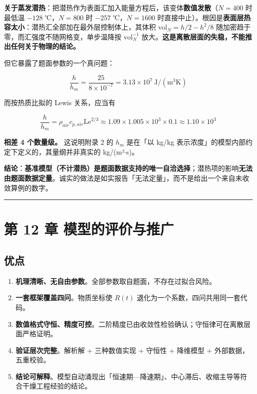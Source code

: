 \textbf{关于蒸发潜热}：把潜热作为表面汇加入能量方程后，该变体\textbf{数值发散}（$N=400$ 时最低温 $-128$ ℃，$N=800$ 时 $-257$ ℃，$N=1600$ 时直接中止）。根因是\textbf{表面层热容太小}：潜热汇全部加在最外层控制体上，其体积 $\mathrm{vol}_N=h/2-h^2/8$ 随加密趋于零，而汇强度不随网格变，单步温降按 $\mathrm{vol}_N^{-1}$ 放大。\textbf{这是离散层面的失稳，不能推出任何关于物理的结论。}


但它暴露了题面参数的一个真问题：


\begin{equation*}
\frac{h}{h_m}=\frac{25}{8\times10^{-7}}=3.13\times10^7\ \mathrm{J/(m^3K)}
\end{equation*}


而按热质比拟的 Lewis 关系，应当有


\begin{equation*}
\frac{h}{h_m}=\rho_{air}c_{p,air}\mathrm{Le}^{2/3}\approx1.09\times1.005\times10^3\times0.1\approx1.10\times10^3
\end{equation*}


\textbf{相差 4 个数量级。} 这说明附录 2 的 $h_m$ 是在「以 kg/kg 表示浓度」的模型内部约定下定义的，其量纲并非真实的 kg/(m²$\cdot$s)。


\textbf{结论}：\textbf{基准模型（不计潜热）是题面数据支持的唯一自洽选择}；潜热项的影响\textbf{无法由题面数据定量}。诚实的做法是如实报告「无法定量」，而不是给出一个来自未收敛算例的数字。


\vspace{1mm}\hrule\vspace{1mm}


\section{第 12 章 模型的评价与推广}


\subsection{优点}


\begin{enumerate}
\item \textbf{机理清晰、无自由参数}。全部参数取自题面，不存在过拟合风险。
\item \textbf{一套框架覆盖四问}。物质坐标使 $R(t)$ 退化为一个系数，四问共用同一套代码。
\item \textbf{数值格式守恒、精度可控}。二阶精度已由收敛性检验确认；守恒律可在离散层面严格证明。
\item \textbf{验证层次完整}。解析解 + 三种数值实现 + 守恒性 + 降维模型 + 外部数据，五重校验。
\item \textbf{结论可解释}。模型自动涌现出「恒速期—降速期」、中心滞后、收缩主导等符合干燥工程经验的结论。
\end{enumerate}



